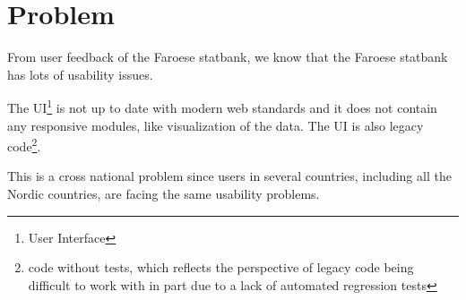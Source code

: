 \section*{Problem}
From user feedback of the Faroese statbank, we know that the Faroese statbank has lots of usability issues.

The UI\footnote{User Interface\label{t::ui}} is not up to date with modern web standards and it does not contain any responsive modules, like visualization of the data. The UI is also legacy code\footnote{ code without tests, which reflects the perspective of legacy code being difficult to work with in part due to a lack of automated regression tests}. 

This is a cross national problem since users in several countries, including all the Nordic countries, are facing the same usability problems.

